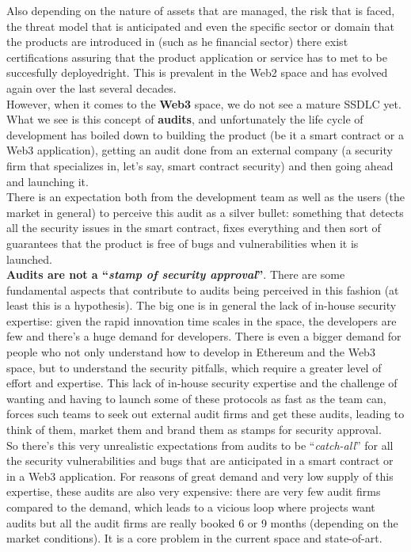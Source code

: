 Also depending on the nature of assets that are managed, the risk that is faced, the threat model that is anticipated and even the specific sector or domain that the products are introduced in (such as he financial sector) there exist certifications assuring that the product application or service has to met to be succesfully deployedright. This is prevalent in the Web2 space and has evolved again over the last several decades.\\

However, when it comes to the \textbf{Web3} space, we do not see a mature SSDLC yet.
What we see is this concept of \textbf{audits}, and unfortunately the life cycle of development has boiled down to building the product (be it a smart contract or a Web3 application), getting an audit done from an external company (a security firm that specializes in, let's say, smart contract security) and then going ahead and launching it.\\

There is an expectation both from the development team as well as the users (the market in general) to perceive this audit as a silver bullet: something that detects all the security issues in the smart contract, fixes everything and then sort of guarantees that the product is free of bugs and vulnerabilities when it is launched.\\

\textbf{Audits are not a ``\textit{stamp of security approval}''}.
There are some fundamental aspects that contribute to audits being perceived in this fashion (at least this is a hypothesis).
The big one is in general the lack of in-house security expertise: given the rapid innovation time scales in the space, the developers are few and there's a huge demand for developers.
There is even a bigger demand for people who not only understand how to develop in Ethereum and the Web3 space, but to understand the security pitfalls, which require a greater level of effort and expertise.
This lack of in-house security expertise and the challenge of wanting and having to launch some of these protocols as fast as the team can, forces such teams to seek out external audit firms and get these audits, leading to think of them, market them and brand them as stamps for security approval.\\

So there's this very unrealistic expectations from audits to be ``\textit{catch-all}'' for all the security vulnerabilities and bugs that are anticipated in a smart contract or in a Web3 application.
For reasons of great demand and very low supply of this expertise, these audits are also very expensive: there are very few audit firms compared to the demand, which leads to a vicious loop where projects want audits but all the audit firms are really booked 6 or 9 months (depending on the market conditions).
It is a core problem in the current space and state-of-art.